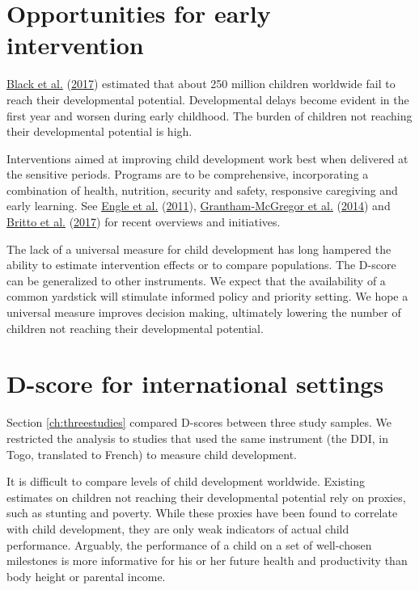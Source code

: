 \documentclass[
]{book}
\begin{document}
\hypertarget{opportunities-for-early-intervention}{%
\section{Opportunities for early intervention}\label{opportunities-for-early-intervention}}

\protect\hyperlink{ref-black2017}{Black et al.} (\protect\hyperlink{ref-black2017}{2017}) estimated that about 250 million children worldwide fail to reach their developmental potential. Developmental delays become evident in the first year and worsen during early childhood. The burden of children not reaching their developmental potential is high.

Interventions aimed at improving child development work best when delivered at the sensitive periods. Programs are to be comprehensive, incorporating a combination of health, nutrition, security and safety, responsive caregiving and early learning. See \protect\hyperlink{ref-engle2011}{Engle et al.} (\protect\hyperlink{ref-engle2011}{2011}), \protect\hyperlink{ref-grantham2014}{Grantham‐McGregor et al.} (\protect\hyperlink{ref-grantham2014}{2014}) and \protect\hyperlink{ref-britto2017}{Britto et al.} (\protect\hyperlink{ref-britto2017}{2017}) for recent overviews and initiatives.

The lack of a universal measure for child development has long hampered the ability to estimate intervention effects or to compare populations. The D-score can be generalized to other instruments. We expect that the availability of a common yardstick will stimulate informed policy and priority setting. We hope a universal measure improves decision making, ultimately lowering the number of children not reaching their developmental potential.

\hypertarget{d-score-for-international-settings}{%
\section{D-score for international settings}\label{d-score-for-international-settings}}

Section \ref{ch:threestudies} compared D-scores between three study samples. We restricted the analysis to studies that used the same instrument (the DDI, in Togo, translated to French) to measure child development.

It is difficult to compare levels of child development worldwide. Existing estimates on children not reaching their developmental potential rely on proxies, such as stunting and poverty. While these proxies have been found to correlate with child development, they are only weak indicators of actual child performance. Arguably, the performance of a child on a set of well-chosen milestones is more informative for his or her future health and productivity than body height or parental income.
\end{document}

